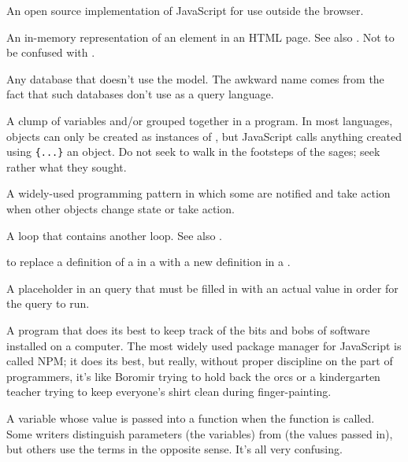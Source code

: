\begin{description}
An open source implementation of JavaScript for use outside the browser.

An in-memory representation of an element in an HTML page. See also
. Not to be confused with .

Any database that doesn't use the  model.
The awkward name comes from the fact that such databases don't use
 as a query language.

A clump of variables and/or  grouped together in a
program. In most languages, objects can only be created as instances of
, but JavaScript calls anything created using \texttt{\{...\}} an
object. Do not seek to walk in the footsteps of the sages; seek rather what
they sought.

A widely-used programming pattern in which some  are
notified and take action when other objects change state or take action.

A loop that contains another loop.
See also .

to replace a definition of a  in a 
with a new definition in a .

A placeholder in an  query that must be filled in with an actual
value in order for the query to run.

A program that does its best to keep track of the bits and bobs of software
installed on a computer. The most widely used package manager for JavaScript
is called NPM; it does its best, but really, without proper discipline on the
part of programmers, it's like Boromir trying to hold back the orcs or a
kindergarten teacher trying to keep everyone's shirt clean during
finger-painting.

A variable whose value is passed into a function when the function is called.
Some writers distinguish parameters (the variables) from
 (the values passed in), but others use the terms in
the opposite sense. It's all very confusing.


\end{description}
